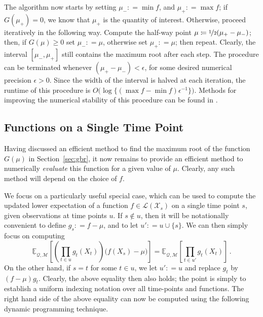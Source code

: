 \documentclass[twoside,11pt]{article}
\newcommand{\states}{\mathcal{X}}
\newcommand{\lexp}{\underline{\mathbb{E}}_{\rateset,\mathcal{M}}}
\newcommand{\gambles}{\mathcal{L}}
\newcommand{\rateset}{\mathcal{Q}}
\newcommand{\coloneqq}{:\!=}
\begin{document}
The algorithm now starts by setting $\mu_-\coloneqq \min f$, and $\mu_+\coloneqq \max f$; if $G(\mu_+)=0$, we know that $\mu_+$ is the quantity of interest. Otherwise, proceed iteratively in the following way. Compute the half-way point $\mu\coloneqq \nicefrac{1}{2}(\mu_+-\mu_-)$; then, if $G(\mu)\geq 0$ set $\mu_-\coloneqq \mu$, otherwise set $\mu_+\coloneqq\mu$; then repeat. Clearly, the interval $[\mu_-,\mu_+]$ still contains the maximum root after each step. The procedure can be terminated whenever $(\mu_+-\mu_-)<\epsilon$, for some desired numerical precision $\epsilon>0$. Since the width of the interval is halved at each iteration, the runtime of this procedure is $O\bigl(\log\{(\max f - \min f)\epsilon^{-1}\}\bigr)$.
Methods for improving the numerical stability of this procedure can be found in \cite[Section 2.7.3]{de2015credal}. %

\subsection{Functions on a Single Time Point}\label{sec:funcs_single_time}

Having discussed an efficient method to find the maximum root of the function $G(\mu)$ in Section~\ref{sec:gbr}, it now remains to provide an efficient method to numerically \emph{evaluate} this function for a given value of $\mu$. Clearly, any such method will depend on the choice of $f$.

We focus on a particularly useful special case, which can be used to compute the updated lower expectation of a function $f\in\gambles(\states_s)$ on a single time point $s$, given observations at time points $u$. If $s\notin u$, then it will be notationally convenient to define $g_s\coloneqq f - \mu$, and to let $u'\coloneqq u\cup \{s\}$. We can then simply focus on computing
\begin{equation*}
\lexp\left[ \left(\prod_{t\in u}g_{t}(X_{t})\right)\bigl(f(X_s) - \mu\bigr) \right] = \lexp\left[ \prod_{t\in u'}g_{t}(X_{t})\right]\,.
\end{equation*}
On the other hand, if $s = t$ for some $t\in u$, we let $u'\coloneqq u$ and replace $g_{t}$ by $(f-\mu)g_{t}$. Clearly, the above equality then also holds; the point is simply to establish a uniform indexing notation over all time-points and functions. The right hand side of the above equality can now be computed using the following dynamic programming technique. 
\end{document}
